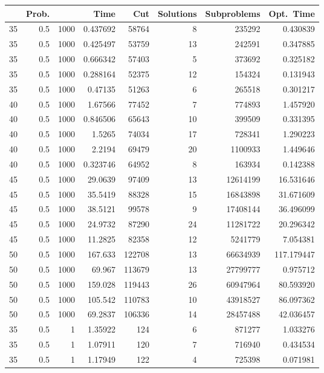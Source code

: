 \documentclass[a4paper,11pt]{article}
\begin{document}
\begin{table}
\begin{center}
\begin{tabular}{|rrr|r|r|rr|r|}
\hline
 & Prob. &  & Time & Cut & Solutions & Subproblems & Opt.\ Time \\
\hline
35 & 0.5 & 1000 & 0.437692 & 58764 & 8 & 235292 & 0.430839 \\
35 & 0.5 & 1000 & 0.425497 & 53759 & 13 & 242591 & 0.347885 \\
35 & 0.5 & 1000 & 0.666342 & 57403 & 5 & 373692 & 0.325182 \\
35 & 0.5 & 1000 & 0.288164 & 52375 & 12 & 154324 & 0.131943 \\
35 & 0.5 & 1000 & 0.47135 & 51263 & 6 & 265518 & 0.301217 \\
40 & 0.5 & 1000 & 1.67566 & 77452 & 7 & 774893 & 1.457920 \\
40 & 0.5 & 1000 & 0.846506 & 65643 & 10 & 399509 & 0.331395 \\
40 & 0.5 & 1000 & 1.5265 & 74034 & 17 & 728341 & 1.290223 \\
40 & 0.5 & 1000 & 2.2194 & 69479 & 20 & 1100933 & 1.449646 \\
40 & 0.5 & 1000 & 0.323746 & 64952 & 8 & 163934 & 0.142388 \\
45 & 0.5 & 1000 & 29.0639 & 97409 & 13 & 12614199 & 16.531646 \\
45 & 0.5 & 1000 & 35.5419 & 88328 & 15 & 16843898 & 31.671609 \\
45 & 0.5 & 1000 & 38.5121 & 99578 & 9 & 17408144 & 36.496099 \\
45 & 0.5 & 1000 & 24.9732 & 87290 & 24 & 11281722 & 20.296342 \\
45 & 0.5 & 1000 & 11.2825 & 82358 & 12 & 5241779 & 7.054381 \\
50 & 0.5 & 1000 & 167.633 & 122708 & 13 & 66634939 & 117.179447 \\
50 & 0.5 & 1000 & 69.967 & 113679 & 13 & 27799777 & 0.975712 \\
50 & 0.5 & 1000 & 159.028 & 119443 & 26 & 60947964 & 80.593920 \\
50 & 0.5 & 1000 & 105.542 & 110783 & 10 & 43918527 & 86.097362 \\
50 & 0.5 & 1000 & 69.2837 & 106336 & 14 & 28457488 & 42.036457 \\
\hline
35 & 0.5 & 1 & 1.35922 & 124 & 6 & 871277 & 1.033276 \\
35 & 0.5 & 1 & 1.07911 & 120 & 7 & 716940 & 0.434534 \\
35 & 0.5 & 1 & 1.17949 & 122 & 4 & 725398 & 0.071981 \\

\end{tabular}
\end{center}
\end{table}
\end{document}
